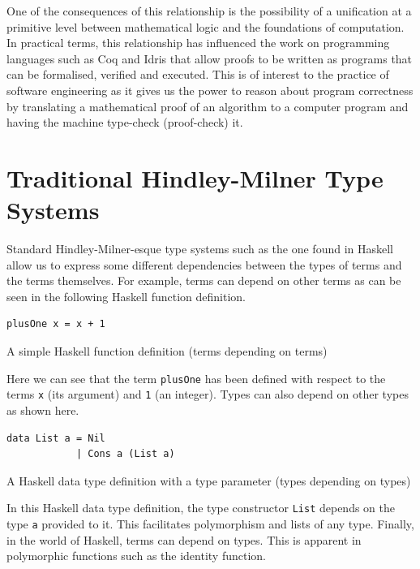 \documentclass[a4paper, notitlepage]{report}
\begin{document}
One of the consequences of this relationship is the possibility of a unification
at a primitive level between mathematical logic and the foundations of
computation. In practical terms, this relationship has influenced the work on
programming languages such as Coq and Idris that allow proofs to be written as
programs that can be formalised, verified and executed. This is of interest to
the practice of software engineering as it gives us the power to reason about
program correctness by translating a mathematical proof of an algorithm to a
computer program and having the machine type-check (proof-check) it.

\section{Traditional Hindley-Milner Type Systems}
\label{sec:org220e7c0}
Standard Hindley-Milner-esque type systems such as the one found in Haskell
allow us to express some different dependencies between the types of terms and
the terms themselves. For example, terms can depend on other terms as can be
seen in the following Haskell function definition.

\begin{listing}[H]
\begin{verbatim}
plusOne x = x + 1
\end{verbatim}
\caption{A simple Haskell function definition (terms depending on terms)}
\end{listing}

Here we can see that the term \texttt{plusOne} has been defined with respect to the terms
\texttt{x} (its argument) and \texttt{1} (an integer). Types can also depend on other types as
shown here.

\begin{listing}[H]
\begin{verbatim}
data List a = Nil
            | Cons a (List a)
\end{verbatim}
\caption{A Haskell data type definition with a type parameter (types depending on types)}
\end{listing}

In this Haskell data type definition, the type constructor \texttt{List} depends on the
type \texttt{a} provided to it. This facilitates polymorphism and lists of any type.
Finally, in the world of Haskell, terms can depend on types. This is apparent in
polymorphic functions such as the identity function.
\end{document}
